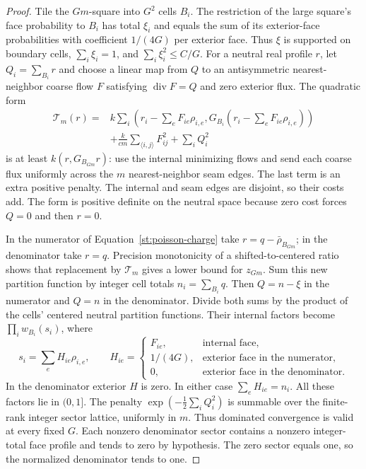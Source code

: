 \begin{proof}
Tile the $Gm$-square into $G^2$ cells $B_i$. The restriction of the large
square's face probability to $B_i$ has total $\xi_i$ and equals the sum of
its exterior-face probabilities with coefficient $1/(4G)$ per exterior
face. Thus $\xi$ is supported on boundary cells, $\sum_i\xi_i=1$, and
$\sum_i\xi_i^2\le C/G$.
For a neutral real profile $r$, let $Q_i=\sum_{B_i}r$ and choose a linear
map from $Q$ to an antisymmetric nearest-neighbor coarse flow $F$ satisfying
$\operatorname{div}F=Q$ and zero exterior flux. The quadratic form
\begin{equation}\label{st:trial-precision}
 \begin{split}
 \mathcal T_m(r)={}&k\sum_i
 \left(r_i-\sum_eF_{ie}\rho_{i,e},
 G_{B_i}\left(r_i-\sum_eF_{ie}\rho_{i,e}\right)\right)\\
 &+\frac{k}{cm}\sum_{\langle i,j\rangle}F_{ij}^2+\sum_iQ_i^2
 \end{split}
\end{equation}
is at least $k(r,G_{B_{Gm}}r)$: use the internal minimizing flows and
send each coarse flux uniformly across the $m$ nearest-neighbor seam
edges. The last term is an extra positive penalty. The internal and seam
edges are disjoint, so their costs add. The form is positive definite on
the neutral space because zero cost forces $Q=0$ and then $r=0$.

In the numerator of Equation~\eqref{st:poisson-charge} take
$r=q-\bar\rho_{B_{Gm}}$; in the denominator take $r=q$. Precision
monotonicity of a shifted-to-centered ratio shows that replacement by
$\mathcal T_m$ gives a lower bound for $z_{Gm}$.
Sum this new partition function by integer cell totals $n_i=\sum_{B_i}q$.
Then $Q=n-\xi$ in the numerator and $Q=n$ in the denominator.
Divide both sums by the product of the cells' centered neutral partition
functions. Their internal factors become $\prod_iw_{B_i}(s_i)$, where
\[
 s_i=\sum_eH_{ie}\rho_{i,e},\qquad
 H_{ie}=\begin{cases}
 F_{ie},&\text{internal face},\\
 1/(4G),&\text{exterior face in the numerator},\\
 0,&\text{exterior face in the denominator}.
 \end{cases}
\]
In the denominator exterior $H$ is zero. In either case $\sum_eH_{ie}=n_i$.
All these factors lie in $(0,1]$. The penalty
$\exp(-\frac12\sum_iQ_i^2)$ is summable over the finite-rank integer sector
lattice, uniformly in $m$. Thus dominated convergence is valid at every
fixed $G$. Each nonzero denominator sector contains a nonzero integer-total
face profile and tends to zero by hypothesis. The zero sector equals one,
so the normalized denominator tends to one.


\end{proof}
